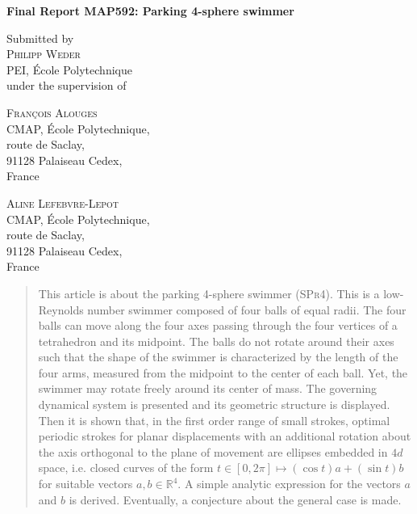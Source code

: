 \documentclass[10pt,a4paper]{article}
\author{Philipp Weder}
\date{}
\numberwithin{equation}{section}
\theoremstyle{plain}
\theoremstyle{plain}
\theoremstyle{plain}
\theoremstyle{remark}
\theoremstyle{definition}
\theoremstyle{definition}
\theoremstyle{plain}
\theoremstyle{plain}
\newcommand{\R}{\mathbb{R}}
\newcommand{\spr}{\textsc{SPr4}}
\begin{document}
\thispagestyle{plain}
\begin{center}
\begin{Large}
\textbf{Final Report MAP592: Parking 4-sphere swimmer}\\
\end{Large}
\vspace{1em}
Submitted by\\
\textsc{Philipp Weder}\\
PEI, École Polytechnique\\
under the supervision of\\
\end{center}
\vspace{1em}
\begin{minipage}[t]{0.5\textwidth}
\begin{center}
\textsc{François Alouges}\\
CMAP, École Polytechnique,\\
route de Saclay,\\
91128 Palaiseau Cedex,\\
France
\end{center}
\end{minipage}
\begin{minipage}[t]{0.5\textwidth}
\begin{center}
\textsc{Aline Lefebvre-Lepot}\\
CMAP, École Polytechnique,\\
route de Saclay,\\
91128 Palaiseau Cedex,\\
France
\end{center}
\end{minipage}

\begin{abstract}
This article is about the parking 4-sphere swimmer (\spr). This is a low-Reynolds number swimmer composed of four balls of equal radii. The four balls can move along the four axes passing through the four vertices of a tetrahedron and its midpoint. The balls do not rotate around their axes such that the shape of the swimmer is characterized by the length of the four arms, measured from the midpoint to the center of each ball. Yet, the swimmer may rotate freely around its center of mass. The governing dynamical system is presented and its geometric structure is displayed. Then it is shown that, in the first order range of small strokes, optimal periodic strokes for planar displacements with an additional rotation about the axis orthogonal to the plane of movement are ellipses embedded in $4d$ space, i.e. closed curves of the form $t \in [0, 2 \pi] \mapsto (\cos t) a + (\sin t) b$ for suitable vectors $a, b \in \R^4$. A simple analytic expression for the vectors $a$ and $b$ is derived. Eventually, a conjecture about the general case is made.
\end{abstract}
\end{document}
